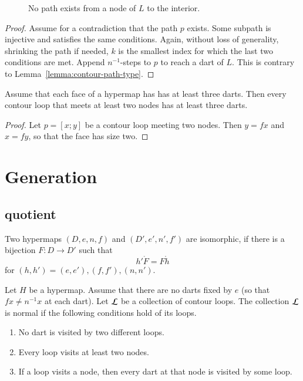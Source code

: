 \begin{figure}[htb]
  \centering
  \caption{No path exists from a node of $L$ to the interior.}
  \label{fig:no-node-path}
\end{figure}

\begin{proof}  Assume for a contradiction that the path $p$ exists.  Some subpath is injective and satisfies the same conditions.  Again, without loss of generality, shrinking the path if needed, $k$ is the smallest index for which the last two conditions are met.  Append $n^{-1}$-steps to $p$ to reach a dart of $L$.  This is contrary to Lemma~\ref{lemma:contour-path-type}.
\end{proof}

\begin{lemma}\label{lemma:3dart}  
Assume that each face of a hypermap has has at least three darts.  Then every contour loop that meets at least two nodes has at least three darts.
\end{lemma}

\begin{proof}  Let $p=[x;y]$ be a contour loop meeting  two nodes.  Then $y = f x$ and $x = f y$, so that the face has size two.
\end{proof}

\section{Generation}

\subsection{quotient}

\begin{definition}[isomorphic] Two hypermaps $(D,e,n,f)$ and $(D',e',n',f')$ are
isomorphic, if there is a bijection $F:D\to D'$ such that
    $$h'\ocirc F = F\ocirc h$$
for $(h,h')=(e,e'), (f,f'), (n,n')$.
\end{definition}


\begin{definition}
Let $H$ be a hypermap. Assume that 
there are no darts fixed by $e$ 
(so that $f x \ne n^{-1} x$ at each dart). 
Let $\cal L$ be a collection of contour
loops.  The collection $\cal L$ is  normal if the following
conditions hold of its loops. \begin{enumerate}
 \item No dart is visited by two different loops.
 \item Every loop visits at least two nodes.
 \item If a loop visits a node, then every dart at that node is visited by some loop.
\end{enumerate}
\end{definition}

